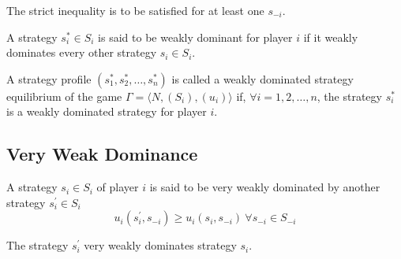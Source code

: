 The strict inequality is to be satisfied for at least one $s_{-i}$.
\begin{defn}
    A strategy $s^*_i \in S_i$ is said to be weakly dominant for player $i$ if it weakly dominates every other strategy $s_i \in S_i$.
\end{defn}
\begin{defn}
    A strategy profile $(s_1^*,s_2^*,\ldots,s_n^*)$ is called a weakly dominated strategy equilibrium of the game $\Gamma = \langle N,(S_i),(u_i)\rangle$ if, $\forall i=1,2,\ldots,n$, the strategy $s_i^*$ is a weakly dominated strategy for player $i$.
\end{defn}
\subsection{Very Weak Dominance}
\begin{defn}
    A strategy $s_i \in S_i$ of player $i$ is said to be very weakly dominated by another strategy $s^\prime_i \in S_i$
    \[u_i(s^\prime_i,s_{-i})\geq u_i(s_i,s_{-i})\ \forall s_{-i} \in S_{-i}\]
\end{defn}
The strategy $s^\prime_i$ very weakly dominates strategy $s_i$.

